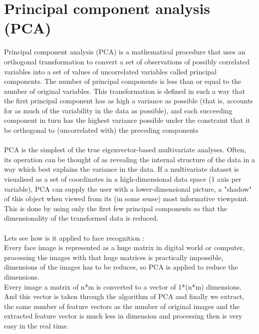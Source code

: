 \documentclass[10pt,a4paper]{article}
\begin{document}
\section{Principal component analysis (PCA)} 

Principal component analysis (PCA) is a mathematical procedure that uses an orthogonal transformation to convert a set of observations of possibly correlated variables into a set of values of uncorrelated variables called principal components. The number of principal components is less than or equal to the number of original variables. This transformation is defined in such a way that the first principal component has as high a variance as possible (that is, accounts for as much of the variability in the data as possible), and each succeeding component in turn has the highest variance possible under the constraint that it be orthogonal to (uncorrelated with) the preceding components \\ \\


PCA is the simplest of the true eigenvector-based multivariate analyses. Often, its operation can be thought of as revealing the internal structure of the data in a way which best explains the variance in the data. If a multivariate dataset is visualised as a set of coordinates in a high-dimensional data space (1 axis per variable), PCA can supply the user with a lower-dimensional picture, a "shadow" of this object when viewed from its (in some sense) most informative viewpoint. This is done by using only the first few principal components so that the dimensionality of the transformed data is reduced. \\ \\

Lets see how is it applied to face recognition : \\ 
Every face image is represented as a huge matrix in digital world or computer, processing the images with that huge matrices is practically impossible, dimensions of the images has to be reduces, so PCA is applied to reduce the dimensions. \\ 

Every image a matrix of n*m is converted to a vector of 1*(n*m) dimensions. And this vector is taken through the algorithm of PCA and finally we extract, the same number of feature vectors as the number of original images and the extracted feature vector is much less in dimension and processing then is very easy in the real time. \\ 
\end{document}
